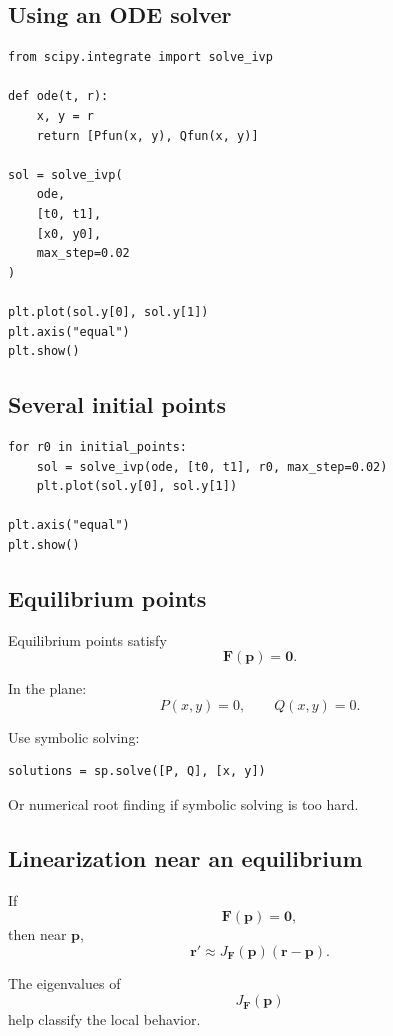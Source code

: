 \subsection*{Using an ODE solver}

\begin{verbatim}
from scipy.integrate import solve_ivp

def ode(t, r):
    x, y = r
    return [Pfun(x, y), Qfun(x, y)]

sol = solve_ivp(
    ode,
    [t0, t1],
    [x0, y0],
    max_step=0.02
)

plt.plot(sol.y[0], sol.y[1])
plt.axis("equal")
plt.show()
\end{verbatim}

\subsection*{Several initial points}

\begin{verbatim}
for r0 in initial_points:
    sol = solve_ivp(ode, [t0, t1], r0, max_step=0.02)
    plt.plot(sol.y[0], sol.y[1])

plt.axis("equal")
plt.show()
\end{verbatim}

\subsection*{Equilibrium points}

Equilibrium points satisfy
\[
\boxed{
    \mathbf F(\mathbf p)=\mathbf 0.
}
\]

In the plane:
\[
\boxed{
    P(x,y)=0,
    \qquad
    Q(x,y)=0.
}
\]

Use symbolic solving:

\begin{verbatim}
solutions = sp.solve([P, Q], [x, y])
\end{verbatim}

Or numerical root finding if symbolic solving is too hard.

\subsection*{Linearization near an equilibrium}

If
\[
    \mathbf F(\mathbf p)=\mathbf 0,
\]
then near \(\mathbf p\),
\[
\boxed{
    \mathbf r'
    \approx
    J_{\mathbf F}(\mathbf p)(\mathbf r-\mathbf p).
}
\]

The eigenvalues of
\[
    J_{\mathbf F}(\mathbf p)
\]
help classify the local behavior.

